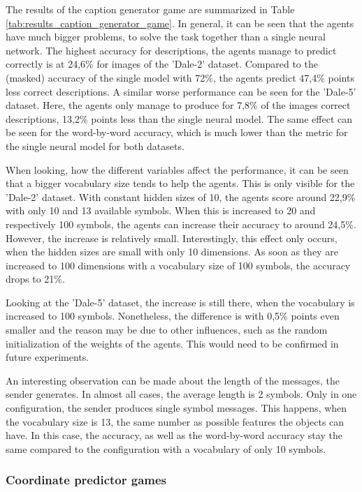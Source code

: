 The results of the caption generator game are summarized in Table \ref{tab:results_caption_generator_game}.
In general, it can be seen that the agents have much bigger problems, to solve the task together than a single neural network.
The highest accuracy for descriptions, the agents manage to predict correctly is at 24,6\% for images of the 'Dale-2' dataset.
Compared to the (masked) accuracy of the single model with 72\%, the agents predict 47,4\% points less correct descriptions.
A similar worse performance can be seen for the 'Dale-5' dataset.
Here, the agents only manage to produce for 7,8\% of the images correct descriptions, 13,2\% points less than the single neural model.
The same effect can be seen for the word-by-word accuracy, which is much lower than the metric for the single neural model for both datasets.

When looking, how the different variables affect the performance, it can be seen that a bigger vocabulary size tends to help the agents.
This is only visible for the 'Dale-2' dataset.
With constant hidden sizes of 10, the agents score around 22,9\% with only 10 and 13 available symbols.
When this is increased to 20 and respectively 100 symbols, the agents can increase their accuracy to around 24,5\%.
However, the increase is relatively small.
Interestingly, this effect only occurs, when the hidden sizes are small with only 10 dimensions.
As soon as they are increased to 100 dimensions with a vocabulary size of 100 symbols, the accuracy drops to 21\%.

Looking at the 'Dale-5' dataset, the increase is still there, when the vocabulary is increased to 100 symbols.
Nonetheless, the difference is with 0,5\% points even smaller and the reason may be due to other influences, such as the random initialization of the weights of the agents.
This would need to be confirmed in future experiments.

An interesting observation can be made about the length of the messages, the sender generates.
In almost all cases, the average length is 2 symbols.
Only in one configuration, the sender produces single symbol messages.
This happens, when the vocabulary size is 13, the same number as possible features the objects can have.
In this case, the accuracy, as well as the word-by-word accuracy stay the same compared to the configuration with a vocabulary of only 10 symbols.


\subsubsection{Coordinate predictor games}
